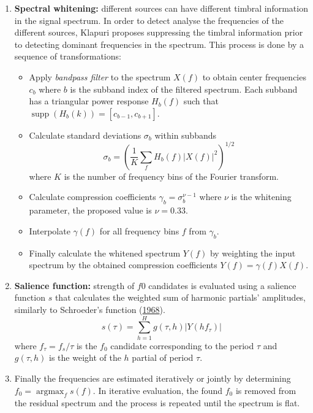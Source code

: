 \documentclass[
  american,
]{article}
\providecommand{\tightlist}{%
  \setlength{\itemsep}{0pt}\setlength{\parskip}{0pt}}
\begin{document}
\begin{enumerate}
\def\labelenumi{\arabic{enumi}.}
\tightlist
\item
  \textbf{Spectral whitening:} different sources can have
  different timbral information in the signal spectrum.
  In order to detect analyse the frequencies of the different
  sources, Klapuri proposes suppressing the timbral
  information prior to detecting dominant frequencies
  in the spectrum.
  This process is done by a sequence of transformations:

  \begin{itemize}
  \tightlist
  \item
    Apply \emph{bandpass filter} to the spectrum \(X(f)\)
    to obtain center frequencies \(c_b\) where \(b\) is
    the subband index of the filtered spectrum.
    Each subband has a triangular power response \(H_b(f)\)
    such that \(\mathop{\mathrm{supp}}\left(H_b(k)\right) = [c_{b-1},c_{b+1}]\).
  \item
    Calculate standard deviations \(\sigma_b\) within subbands
    \[\sigma_b=\left(\frac{1}{K}\sum_f H_b(f)\left\lvert X(f)\right\rvert^2\right)^{1/2}\]
    where \(K\) is the number of frequency bins of the Fourier transform.
  \item
    Calculate compression coefficients \(\gamma_b=\sigma_b^{\nu-1}\)
    where \(\nu\) is the whitening parameter, the proposed value is \(\nu=0.33\).
  \item
    Interpolate \(\gamma(f)\) for all frequency bins \(f\) from \(\gamma_b\).
  \item
    Finally calculate the whitened spectrum \(Y(f)\) by weighting
    the input spectrum by the obtained compression coefficients
    \(Y(f)=\gamma(f)X(f)\).
  \end{itemize}
\item
  \textbf{Salience function:} strength of \(f0\) candidates is evaluated
  using a salience function \(s\) that calculates the weighted sum
  of harmonic partials' amplitudes, similarly to Schroeder's function
  (\protect\hyperlink{ref-schroeder_period_1968}{1968}).
  \[s(\tau) = \sum_{h=1}^H g(\tau,h)\left\lvert Y(hf_{\tau})\right\rvert\]
  where \(f_{\tau}=f_s/\tau\) is the \(f_0\) candidate corresponding
  to the period \(\tau\) and \(g(\tau,h)\) is the weight of the
  \(h\) partial of period \(\tau\).
\item
  Finally the frequencies are estimated iteratively or jointly
  by determining \(f_0=\mathop{\mathrm{argmax}}_{f} s(f)\).
  In iterative evaluation, the found \(f_0\) is removed from the residual
  spectrum and the process is repeated until the spectrum is flat.
\end{enumerate}
\end{document}
